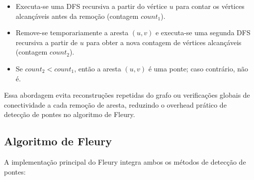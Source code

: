\documentclass[12pt]{article}
\begin{document}
\begin{itemize}
  \item Executa-se uma DFS recursiva a partir do vértice \(u\) para contar os vértices alcançáveis antes da remoção (contagem \(count_1\)).
  \item Remove-se temporariamente a aresta \((u,v)\) e executa-se uma segunda DFS recursiva a partir de \(u\) para obter a nova contagem de vértices alcançáveis (contagem \(count_2\)).
  \item Se \(count_2 < count_1\), então a aresta \((u,v)\) é uma ponte; caso contrário, não é.
\end{itemize}

Essa abordagem evita reconstruções repetidas do grafo ou verificações globais de conectividade a cada remoção de aresta, reduzindo o overhead prático de detecção de pontes no algoritmo de Fleury.

\subsection{Algoritmo de Fleury}

A implementação principal do Fleury integra ambos os métodos de detecção de pontes:
\end{document}
